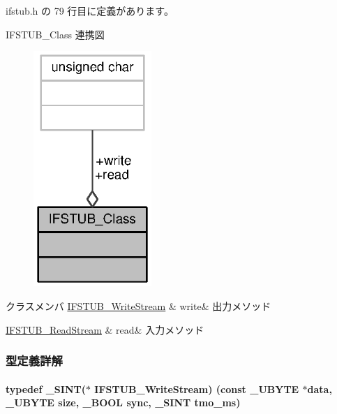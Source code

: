  ifstub.\+h の 79 行目に定義があります。



I\+F\+S\+T\+U\+B\+\_\+\+Class 連携図
\nopagebreak
\begin{figure}[H]
\begin{center}
\leavevmode
\includegraphics[width=127pt]{d9/de9/structIFSTUB__Class__coll__graph}
\end{center}
\end{figure}
\begin{DoxyFields}{クラスメンバ}
\hyperlink{ifstub_8h_aa9d065d1024ada655c29137cc02240a3_aa9d065d1024ada655c29137cc02240a3}{I\+F\+S\+T\+U\+B\+\_\+\+Write\+Stream}\label{ifstub_8h_a614c7ab257545b1f3f655662c5eaadcd}
&
write&
出力メソッド \\
\hline

\hyperlink{ifstub_8h_a620340ac755d877dfbe38fee8263e6fe_a620340ac755d877dfbe38fee8263e6fe}{I\+F\+S\+T\+U\+B\+\_\+\+Read\+Stream}\label{ifstub_8h_a8e34fb2d165bf4811e25e30ecda1019c}
&
read&
入力メソッド \\
\hline

\end{DoxyFields}


\subsubsection{型定義詳解}
\paragraph[{I\+F\+S\+T\+U\+B\+\_\+\+Write\+Stream}]{\setlength{\rightskip}{0pt plus 5cm}typedef {\bf \+\_\+\+S\+I\+N\+T}($\ast$ I\+F\+S\+T\+U\+B\+\_\+\+Write\+Stream) (const {\bf \+\_\+\+U\+B\+Y\+T\+E} $\ast$data, {\bf \+\_\+\+U\+B\+Y\+T\+E} size, {\bf \+\_\+\+B\+O\+O\+L} sync, {\bf \+\_\+\+S\+I\+N\+T} tmo\+\_\+ms)}\label{ifstub_8h_aa9d065d1024ada655c29137cc02240a3_aa9d065d1024ada655c29137cc02240a3}



